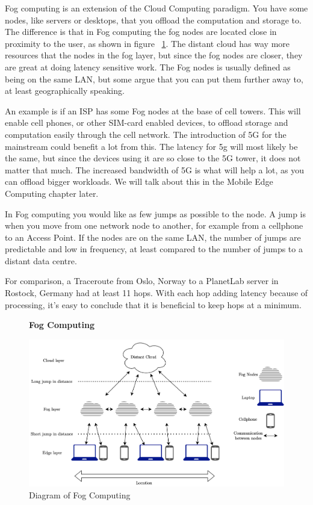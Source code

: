 Fog computing is an extension of the Cloud Computing paradigm. You have some nodes, like servers or desktops, that you offload the computation and storage to. The difference is that in Fog computing the fog nodes are located close in proximity to the user\cite{msftadmin_concept_2020}, as shown in figure ~\ref{fig:FogDiagram}. The distant cloud has way more resources that the nodes in the fog layer, but since the fog nodes are closer, they are great at doing latency sensitive work. The Fog nodes is usually defined as being on the same LAN, but some argue that you can put them further away to, at least geographically speaking. 

An example is if an ISP has some Fog nodes at the base of cell towers. This will enable cell phones, or other SIM-card enabled devices, to offload storage and computation easily through the cell network. The introduction of 5G for the mainstream could benefit a lot from this. The latency for 5g will most likely be the same, but since the devices using it are so close to the 5G tower, it does not matter that much. The increased bandwidth of 5G is what will help a lot, as you can offload bigger workloads. We will talk about this in the Mobile Edge Computing chapter later. 

In Fog computing you would like as few jumps as possible to the node. A jump is when you move from one network node to another, for example from a cellphone to an Access Point. If the nodes are on the same LAN, the number of jumps are predictable and low in frequency, at least compared to the number of jumps to a distant data centre. 


For comparison, a Traceroute\cite{noauthor_traceroute68_nodate} from Oslo, Norway to a PlanetLab server in Rostock, Germany had at least 11 hops. With each hop adding latency because of processing, it’s easy to conclude that it is beneficial to keep hops at a minimum.

\begin{figure}[t]
    \centering
    \textbf{Fog Computing}\par\medskip
    \includegraphics[scale=0.7]{chapters/background/Fog.png}
    \caption{Diagram of Fog Computing}
    \label{fig:FogDiagram}
\end{figure}

